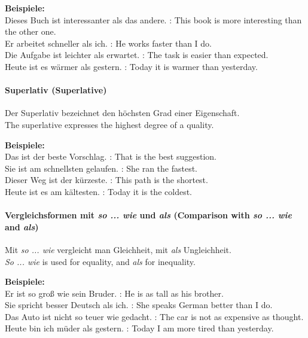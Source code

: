 \documentclass[a4paper]{article}
\begin{document}
            \textbf{Beispiele:}\\
            Dieses Buch ist interessanter als das andere. : This book is more interesting than the other one.\\
            Er arbeitet schneller als ich. : He works faster than I do.\\
            Die Aufgabe ist leichter als erwartet. : The task is easier than expected.\\
            Heute ist es wärmer als gestern. : Today it is warmer than yesterday.
        
        \paragraph{Superlativ {\small (Superlative)}}
            Der Superlativ bezeichnet den höchsten Grad einer Eigenschaft.\\
            The superlative expresses the highest degree of a quality.
            
            \textbf{Beispiele:}\\
            Das ist der beste Vorschlag. : That is the best suggestion.\\
            Sie ist am schnellsten gelaufen. : She ran the fastest.\\
            Dieser Weg ist der kürzeste. : This path is the shortest.\\
            Heute ist es am kältesten. : Today it is the coldest.
        
        \paragraph{Vergleichsformen mit \textit{so ... wie} und \textit{als} {\small (Comparison with \textit{so ... wie} and \textit{als})}}
            Mit \textit{so ... wie} vergleicht man Gleichheit, mit \textit{als} Ungleichheit.\\
            \textit{So ... wie} is used for equality, and \textit{als} for inequality.
            
            \textbf{Beispiele:}\\
            Er ist so groß wie sein Bruder. : He is as tall as his brother.\\
            Sie spricht besser Deutsch als ich. : She speaks German better than I do.\\
            Das Auto ist nicht so teuer wie gedacht. : The car is not as expensive as thought.\\
            Heute bin ich müder als gestern. : Today I am more tired than yesterday.
        
\end{document}
